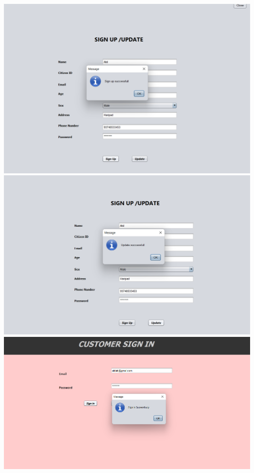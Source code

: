 \documentclass[a4paper,12pt]{report}
\begin{document}
\begin{flushleft}
  \includegraphics[scale=0.39]{o4.png}
  \includegraphics[scale=0.39]{o5.png}
  \includegraphics[scale=0.39]{o6.png}
  
\end{flushleft} 
\newpage
\end{document}
